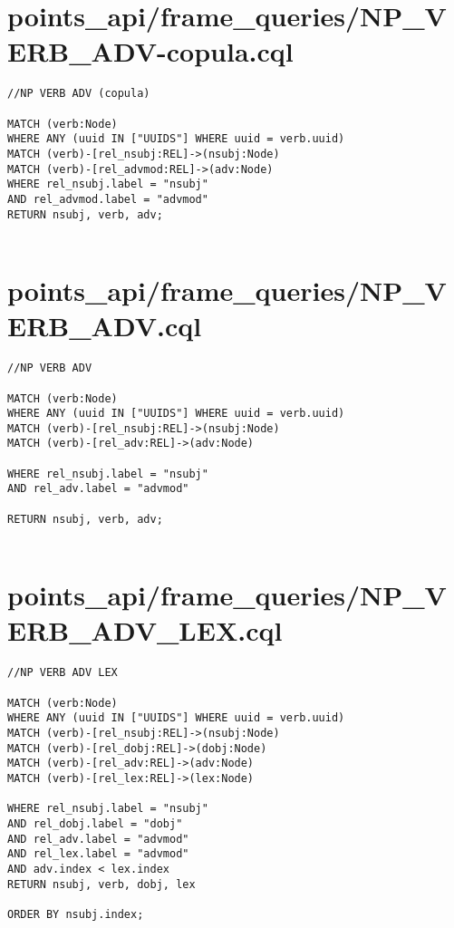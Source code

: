 \documentclass{article}
\begin{document}
\section*{points\_api/frame\_queries/NP\_VERB\_ADV-copula.cql}
\begin{verbatim}
//NP VERB ADV (copula)

MATCH (verb:Node)
WHERE ANY (uuid IN ["UUIDS"] WHERE uuid = verb.uuid)
MATCH (verb)-[rel_nsubj:REL]->(nsubj:Node)
MATCH (verb)-[rel_advmod:REL]->(adv:Node)
WHERE rel_nsubj.label = "nsubj"
AND rel_advmod.label = "advmod"
RETURN nsubj, verb, adv;


\end{verbatim}
\pagebreak

\section*{points\_api/frame\_queries/NP\_VERB\_ADV.cql}
\begin{verbatim}
//NP VERB ADV

MATCH (verb:Node)
WHERE ANY (uuid IN ["UUIDS"] WHERE uuid = verb.uuid)
MATCH (verb)-[rel_nsubj:REL]->(nsubj:Node)
MATCH (verb)-[rel_adv:REL]->(adv:Node)

WHERE rel_nsubj.label = "nsubj"
AND rel_adv.label = "advmod"

RETURN nsubj, verb, adv;


\end{verbatim}
\pagebreak

\section*{points\_api/frame\_queries/NP\_VERB\_ADV\_LEX.cql}
\begin{verbatim}
//NP VERB ADV LEX

MATCH (verb:Node)
WHERE ANY (uuid IN ["UUIDS"] WHERE uuid = verb.uuid)
MATCH (verb)-[rel_nsubj:REL]->(nsubj:Node)
MATCH (verb)-[rel_dobj:REL]->(dobj:Node)
MATCH (verb)-[rel_adv:REL]->(adv:Node)
MATCH (verb)-[rel_lex:REL]->(lex:Node)

WHERE rel_nsubj.label = "nsubj"
AND rel_dobj.label = "dobj"
AND rel_adv.label = "advmod"
AND rel_lex.label = "advmod"
AND adv.index < lex.index
RETURN nsubj, verb, dobj, lex

ORDER BY nsubj.index;


\end{verbatim}
\pagebreak
\end{document}
